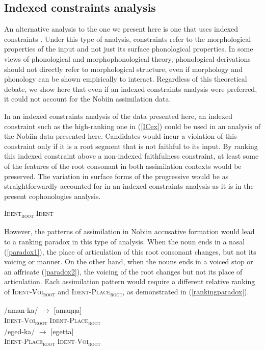 \documentclass[output=paper]{langscibook}
\begin{document}
\subsection{Indexed constraints analysis}
An alternative analysis to the one we present here is one that uses indexed constraints \citep{beckman1995, beckman1997}. Under this type of analysis, constraints refer to the morphological properties of the input and not just its surface phonological properties. In some views of phonological and morphophonological theory, phonological derivations should not directly refer to morphological structure, even if morphology and phonology can be shown empirically to interact. Regardless of this theoretical debate, we show here that even if an indexed constraints analysis were preferred, it could not account for the Nobiin assimilation data. 

In an indexed constraints analysis of the data presented here, an indexed constraint such as the high-ranking one in (\ref{ICex}) could be used in an analysis of the Nobiin data presented here. Candidates would incur a violation of this constraint only if it is a root segment that is not faithful to its input. By ranking this indexed constraint above a non-indexed faithfulness constraint, at least some of the features of the root consonant in both assimilation contexts would be preserved. The variation in surface forms of the progressive would be as straightforwardly accounted for in an indexed constraints analysis as it is in the present cophonologies analysis. 

\ea \label{ICex}
\textsc{Ident\textsubscript{root}} \guillemotright \textsc{Ident}
\z


However, the patterns of assimilation in Nobiin accusative formation would lead to a ranking paradox in this type of analysis. When the noun ends in a nasal (\ref{paradox1}), the place of articulation of this root consonant changes, but not its voicing or manner. On the other hand, when the nouns ends in a voiced stop or an affricate (\ref{paradox2}), the voicing of the root changes but not its place of articulation. Each assimilation pattern would require a different relative ranking of \textsc{Ident-Voi\textsubscript{root}} and \textsc{Ident-Place\textsubscript{root}}, as demonstrated in (\ref{rankingparadox}).

\ea \label{rankingparadox}

\begin{xlist}

\ex /aman-ka/ $\rightarrow$ [amaŋŋa] \\ \label{paradox1} \textsc{Ident-Voi\textsubscript{root}} \guillemotright \textsc{Ident-Place\textsubscript{root}}\\
\ex/eged-ka/ $\rightarrow$ [egetta]\\ \label{paradox2} \textsc{Ident-Place\textsubscript{root}} \guillemotright \textsc{Ident-Voi\textsubscript{root}}

\end{xlist}
\end{document}

